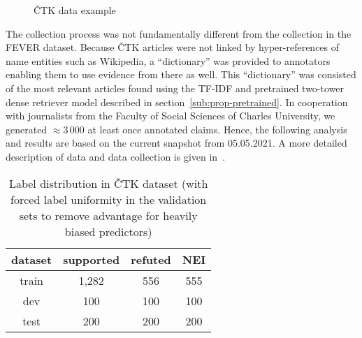     \begin{figure}[H]
        \centering
        \caption{ČTK data example}
        \label{fig:data-example}
    \end{figure}
    
    The collection process was not fundamentally different from the collection in the FEVER dataset. Because ČTK articles were not linked by hyper-references of name entities such as Wikipedia, a \enquote{dictionary} was provided to annotators enabling them to use evidence from there as well. This \enquote{dictionary} was consisted of the most relevant articles found using the TF-IDF and pretrained two-tower dense retriever model described in section~\ref{sub:prop-pretrained}. In cooperation with journalists from the Faculty of Social Sciences of Charles University, we generated $\approx 3\,000$ at least once annotated claims.
    Hence, the following analysis and results are based on the current snapshot from 05.05.2021. A more detailed description of data and data collection is given in~\parencite{herbert-mt}.
    
    \begin{table}[h]
        \centering
        \begin{tabular}{ c | c c c }
            \textbf{dataset} & \textbf{supported} & \textbf{refuted} & \textbf{NEI}  \\
            \hline
            train & 1,282 & 556 & 555\\
            dev & 100 & 100 & 100\\
            test & 200 & 200 & 200\\
        \end{tabular}
        \caption[Label distribution in ČTK dataset]{Label distribution in ČTK dataset (with forced label uniformity in the validation sets to remove advantage for heavily biased predictors)}
        \label{table:ctk-label-split}
    \end{table}
    
